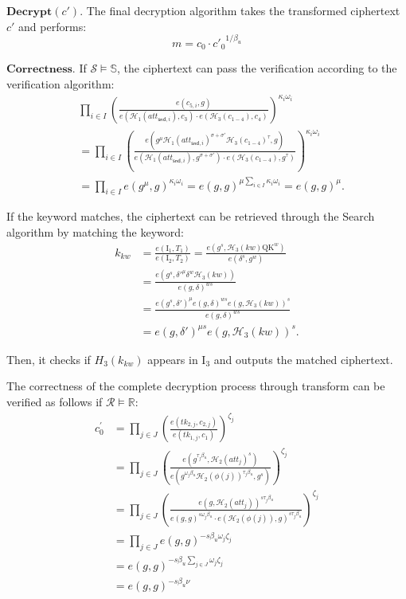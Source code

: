 \documentclass[runningheads]{llncs}
\begin{document}
$\mathbf{Decrypt}(c')$. The final decryption algorithm takes the transformed ciphertext $c'$ and performs:
$$m = c_0 \cdot {c'_0}^{1/\beta_u}$$

$\mathbf{Correctness}$.
If $ \mathcal{S} \models \mathbb{S} $, the ciphertext can pass the verification according to the verification algorithm:
$$
\begin{aligned}
&\prod_{i \in I} \left( \frac{e(c_{5,i}, g)}{e(\mathcal{H}_1(att_{\mathsf{snd},i}), c_3) \cdot e(\mathcal{H}_3(c_{1-4}), c_4)} \right)^{\kappa_i \omega_i} \\
&= \prod_{i \in I} \left( \frac{e(g^\mu \mathcal{H}_1(att_{\mathsf{snd},i})^{\sigma + \sigma'} \mathcal{H}_3(c_{1-4})^\tau, g)}{e(\mathcal{H}_1(att_{\mathsf{snd},i}), g^{\sigma + \sigma'}) \cdot e(\mathcal{H}_3(c_{1-4}), g^\tau)} \right)^{\kappa_i \omega_i} \\
&= \prod_{i \in I} e(g^\mu, g)^{\kappa_i \omega_i} = e(g, g)^{\mu \sum_{i \in I} \kappa_i \omega_i} = e(g, g)^\mu.
\end{aligned}
$$

If the keyword matches, the ciphertext can be retrieved through the Search algorithm by matching the keyword:
$$
\begin{aligned}
k_{kw} &= \frac{e(\text{I}_1, T_1)}{e(\text{I}_2, T_2)} = \frac{e(g^s, \mathcal{H}_3(kw) \text{QK}^w)}{e(\delta^s, g^w)} \\
&= \frac{e(g^s, \delta'^\mu \delta^w \mathcal{H}_3(kw))}{e(g, \delta)^{w s}} \\
&= \frac{e(g^s, \delta')^{\mu} e(g, \delta)^{w s} e(g, \mathcal{H}_3(kw))^s}{e(g, \delta)^{w s}} \\
&= e(g, \delta')^{\mu s} e(g, \mathcal{H}_3(kw))^s.
\end{aligned}
$$

Then, it checks if $H_{3}(k_{kw})$ appears in $\text{I}_3$ and outputs the matched ciphertext.

The correctness of the complete decryption process through transform can be verified as follows if $ \mathcal{R} \models \mathbb{R} $:
$$
\begin{aligned}
c_0^{\prime} & =\prod_{j\in J}\left(\frac{e(tk_{2,j}, c_{2,j})}{e(tk_{1,j}, c_1)}\right)^{\zeta_{j}} \\
& =\prod_{j\in J}\left(\frac{e(g^{\tau_{j}\beta_u},\mathcal{H}_2(att_{j})^{s})}{e(g^{\omega_{j}\beta_u}\mathcal{H}_2(\phi(j))^{\tau_{j}\beta_u},g^{s})}\right)^{\zeta_{j}}\\  
& =\prod_{j\in J}\left(\frac{{e(g,\mathcal{H}_2(att_{j}))^{s\tau_{j}\beta_u}}}{e(g,g)^{s\omega_{j}\beta_u}\cdot{e(\mathcal{H}_2(\phi(j)),g)^{s\tau_{j}\beta_u}}}\right)^{\zeta_{j}}\\  
& =\prod_{j\in J}e(g,g)^{-s\beta_u\omega_{j}\zeta_{j}}\\  
& =e(g,g)^{-s\beta_u\sum_{j\in J}\omega_{j}\zeta_{j}}\\  
& =e(g,g)^{-s\beta_u\nu}
\end{aligned}
$$
\end{document}
